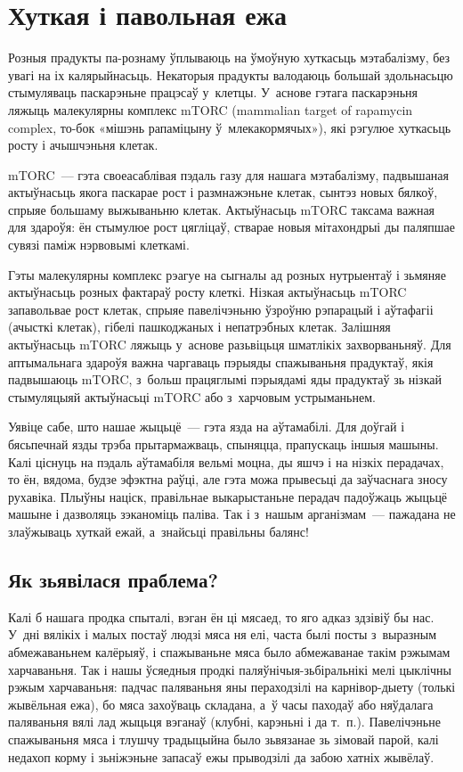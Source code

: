 \chapter{Хуткая і павольная ежа}

Розныя прадукты па-рознаму ўплываюць на ўмоўную хуткасьць мэтабалізму, без увагі на іх калярыйнасьць. Некаторыя прадукты валодаюць большай здольнасьцю стымуляваць паскарэньне працэсаў у~клетцы. У~аснове гэтага паскарэньня ляжыць малекулярны комплекс mTORC (mammalian target of rapamycin complex, то-бок «мішэнь рапаміцыну ў~млекакормячых»), які рэгулюе хуткасьць росту і ачышчэньня клетак.
 
mTORC~--- гэта своеасаблівая пэдаль газу для нашага мэтабалізму, падвышаная актыўнасьць якога паскарае рост і размнажэньне клетак, сынтэз новых бялкоў, спрыяе большаму выжываньню клетак. Актыўнасьць mTORС таксама важная для здароўя: ён стымулюе рост цягліцаў, стварае новыя мітахондрыі ды паляпшае сувязі паміж нэрвовымі клеткамі.

Гэты малекулярны комплекс рэагуе на сыгналы ад розных нутрыентаў і зьмяняе актыўнасьць розных фактараў росту клеткі. Нізкая актыўнасьць mTORC запавольвае рост клетак, спрыяе павелічэньню ўзроўню рэпарацый і аўтафагіі (ачысткі клетак), гібелі пашкоджаных і непатрэбных клетак. Залішняя актыўнасьць mTORC ляжыць у~аснове разьвіцьця шматлікіх захворваньняў. Для аптымальнага здароўя важна чаргаваць пэрыяды спажываньня прадуктаў, якія падвышаюць mTORC, з~больш працяглымі пэрыядамі яды прадуктаў зь нізкай стымуляцыяй актыўнасьці mTORC або з~харчовым устрыманьнем.

Уявіце сабе, што нашае жыцьцё~--- гэта язда на аўтамабілі. Для доўгай і бясьпечнай язды трэба прытармажваць, спыняцца, прапускаць іншыя машыны. Калі ціснуць на пэдаль аўтамабіля вельмі моцна, ды яшчэ і на нізкіх перадачах, то ён, вядома, будзе эфэктна раўці, але гэта можа прывесьці да заўчаснага зносу рухавіка. Плыўны націск, правільнае выкарыстаньне перадач падоўжаць жыцьцё машыне і дазволяць зэканоміць паліва. Так і з~нашым арганізмам~--- пажадана не злаўжываць хуткай ежай, а~знайсьці правільны балянс!

\section{Як зьявілася праблема?}

Калі б нашага продка спыталі, вэган ён ці мясаед, то яго адказ здзівіў бы нас. У~дні вялікіх і малых постаў людзі мяса ня елі, часта былі посты з~выразным абмежаваньнем калёрыяў, і спажываньне мяса было абмежаванае такім рэжымам харчаваньня. Так і нашы ўсяедныя продкі паляўнічыя-зьбіральнікі мелі цыклічны рэжым харчаваньня: падчас паляваньня яны пераходзілі на карнівор-дыету (толькі жывёльная ежа), бо мяса захоўваць складана, а~ў часы паходаў або няўдалага паляваньня вялі лад жыцьця вэганаў (клубні, карэньні і да т.~п.). Павелічэньне спажываньня мяса і тлушчу традыцыйна было зьвязанае зь зімовай парой, калі недахоп корму і зьніжэньне запасаў ежы прыводзілі да забою хатніх жывёлаў.

